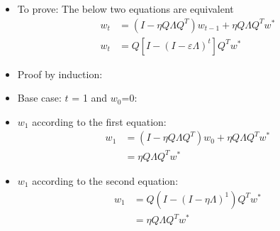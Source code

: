 \begin{frame}
\end{frame}

\begin{frame}
	\begin{overlayarea}{\textwidth}{\textheight}
		\begin{itemize}
			\item<1-> To prove: The below two equations are equivalent
				\begin{align*}
					w_t & = (I-\eta Q \Lambda Q^{T} )w_{t-1}+\eta Q \Lambda Q^{T} w^{*}\\
					w_t & = Q[I-(I-\varepsilon \Lambda)^{t}]Q^{T}w^{*} 
				\end{align*}
			\item<2-> Proof by induction:
			\item<3-> Base case: $t$ = 1 and $w_0$=0:
			\item<4-> $w_1$ according to the first equation:
				\begin{align*}
					w_1 & = (I - \eta Q\Lambda Q^T) w_0 + \eta Q\Lambda Q^T w^* \\
					         & = \eta Q\Lambda Q^T w^*
				\end{align*}
			\item<5-> $w_1$ according to the second equation:
                \begin{align*}
					w_1 & = Q(I - (I - \eta \Lambda)^1)Q^T w^*\\
                  			 & = \eta Q\Lambda Q^T w^*
                \end{align*}
        \end{itemize}
	\end{overlayarea}
\end{frame}

